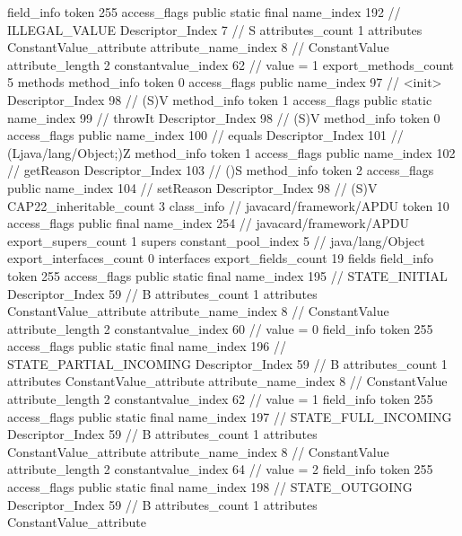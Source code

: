 {{{{			field_info {
				token	255
				access_flags	public static final
				name_index	192		// ILLEGAL_VALUE
				Descriptor_Index	7		// S
				attributes_count	1
				attributes {
				ConstantValue_attribute {
					attribute_name_index	8		// ConstantValue
					attribute_length	2
					constantvalue_index	62		// value = 1
				}
				}
			}
			}
			export_methods_count	5
			methods {
				method_info {
					token	0
					access_flags	public
					name_index	97		// <init>
					Descriptor_Index	98		// (S)V
				}
				method_info {
					token	1
					access_flags	public static
					name_index	99		// throwIt
					Descriptor_Index	98		// (S)V
				}
				method_info {
					token	0
					access_flags	public
					name_index	100		// equals
					Descriptor_Index	101		// (Ljava/lang/Object;)Z
				}
				method_info {
					token	1
					access_flags	public
					name_index	102		// getReason
					Descriptor_Index	103		// ()S
				}
				method_info {
					token	2
					access_flags	public
					name_index	104		// setReason
					Descriptor_Index	98		// (S)V
				}
			}
			CAP22_inheritable_count	3
		}
		class_info {		// javacard/framework/APDU
			token	10
			access_flags	public final
			name_index	254		// javacard/framework/APDU
			export_supers_count	1
			supers {
				constant_pool_index	5		// java/lang/Object
			}
			export_interfaces_count	0
			interfaces {
			}
			export_fields_count	19
			fields {
			field_info {
				token	255
				access_flags	public static final
				name_index	195		// STATE_INITIAL
				Descriptor_Index	59		// B
				attributes_count	1
				attributes {
				ConstantValue_attribute {
					attribute_name_index	8		// ConstantValue
					attribute_length	2
					constantvalue_index	60		// value = 0
				}
				}
			}
			field_info {
				token	255
				access_flags	public static final
				name_index	196		// STATE_PARTIAL_INCOMING
				Descriptor_Index	59		// B
				attributes_count	1
				attributes {
				ConstantValue_attribute {
					attribute_name_index	8		// ConstantValue
					attribute_length	2
					constantvalue_index	62		// value = 1
				}
				}
			}
			field_info {
				token	255
				access_flags	public static final
				name_index	197		// STATE_FULL_INCOMING
				Descriptor_Index	59		// B
				attributes_count	1
				attributes {
				ConstantValue_attribute {
					attribute_name_index	8		// ConstantValue
					attribute_length	2
					constantvalue_index	64		// value = 2
				}
				}
			}
			field_info {
				token	255
				access_flags	public static final
				name_index	198		// STATE_OUTGOING
				Descriptor_Index	59		// B
				attributes_count	1
				attributes {
				ConstantValue_attribute {
}}}}}}}
